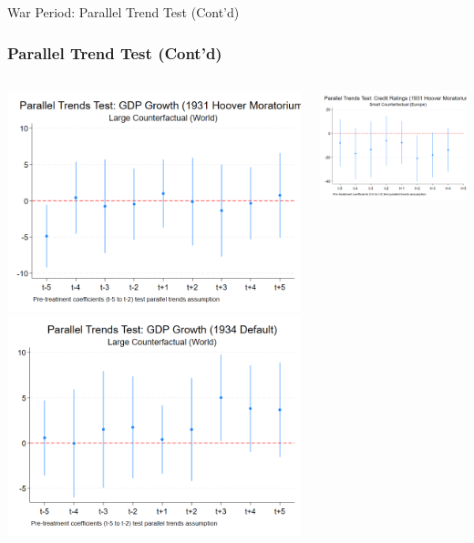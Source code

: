 \documentclass{beamer}
\begin{document}
\begin{frame}{War Period: Parallel Trend Test (Cont'd)}
  \frametitle{Parallel Trend Test (Cont'd)}
  \begin{columns}[T] %
    \begin{column}{0.45\textwidth}
      \centering
      \includegraphics[width=0.9\linewidth]{figures/PT_GDP_1931_Large.png}
      \includegraphics[width=0.9\linewidth]{figures/PT_GDP_1934_Large.png}
    \end{column}
    \begin{column}{0.45\textwidth}
      \centering
      \includegraphics[width=0.9\linewidth]{figures/PT_Ratings_1931.png}

\end{column}
\end{columns}
\end{frame}
\end{document}
